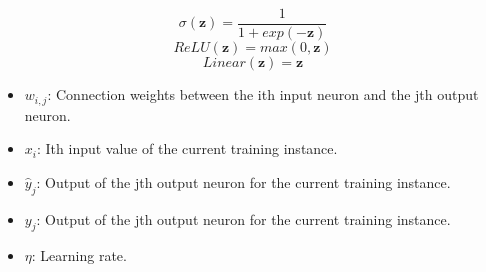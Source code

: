 \documentclass[12pt]{article}
\begin{document}
\begin{multicols}{3}
	\noindent
	\begin{equation}
		\sigma(\textbf{z})=\frac{1}{1+ exp(-\textbf{z})} 
		\label{logistic-activation-function}
    \end{equation}
    \begin{equation}
		ReLU(\textbf{z}) = max(0,\textbf{z})
		\label{relu-activation-function}
	\end{equation}
	\begin{equation}
		Linear(\textbf{z}) = \textbf{z}
		\label{linear-activation-function}
	\end{equation}
\end{multicols}
\singlespacing
\begin{itemize}
	\item $w_{i,j}$: Connection weights between the ith input neuron and the jth output neuron. 
	\item $x_i$: Ith input value of the current training instance.
	\item $\hat{y}_{j}$: Output of the jth output neuron for the current training instance.
	\item $y_{j}$: Output of the jth output neuron for the current training instance.
	\item $\eta$: Learning rate.
\end{itemize}
\doublespacing
\end{document}
